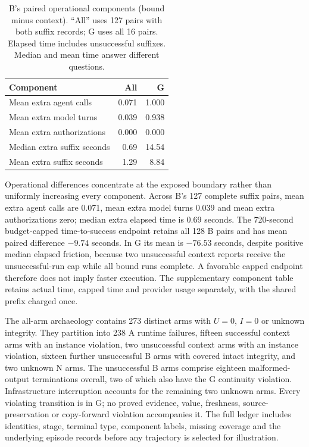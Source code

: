 \documentclass[10pt,a4paper,twocolumn]{article}
\begin{document}
\begin{table}[t]
\centering\small
\caption{B's paired operational components (bound minus context). ``All'' uses 127 pairs with both suffix records; G uses all 16 pairs. Elapsed time includes unsuccessful suffixes. Median and mean time answer different questions.}
\label{tab:friction}
\begin{tabular}{@{}lrr@{}}
\toprule
Component & All & G \\
\midrule
Mean extra agent calls & 0.071 & 1.000 \\
Mean extra model turns & 0.039 & 0.938 \\
Mean extra authorizations & 0.000 & 0.000 \\
Median extra suffix seconds & 0.69 & 14.54 \\
Mean extra suffix seconds & 1.29 & 8.84 \\
\bottomrule
\end{tabular}
\end{table}

Operational differences concentrate at the exposed boundary rather than uniformly increasing every component. Across B's 127 complete suffix pairs, mean extra agent calls are 0.071, mean extra model turns 0.039 and mean extra authorizations zero; median extra elapsed time is 0.69 seconds. The 720-second budget-capped time-to-success endpoint retains all 128 B pairs and has mean paired difference $-9.74$ seconds. In G its mean is $-76.53$ seconds, despite positive median elapsed friction, because two unsuccessful context reports receive the unsuccessful-run cap while all bound runs complete. A favorable capped endpoint therefore does not imply faster execution. The supplementary component table retains actual time, capped time and provider usage separately, with the shared prefix charged once.

The all-arm archaeology contains 273 distinct arms with $U=0$, $I=0$ or unknown integrity. They partition into 238 A runtime failures, fifteen successful context arms with an instance violation, two unsuccessful context arms with an instance violation, sixteen further unsuccessful B arms with covered intact integrity, and two unknown N arms. The unsuccessful B arms comprise eighteen malformed-output terminations overall, two of which also have the G continuity violation. Infrastructure interruption accounts for the remaining two unknown arms. Every violating transition is in G; no proved evidence, value, freshness, source-preservation or copy-forward violation accompanies it. The full ledger includes identities, stage, terminal type, component labels, missing coverage and the underlying episode records before any trajectory is selected for illustration.
\end{document}
